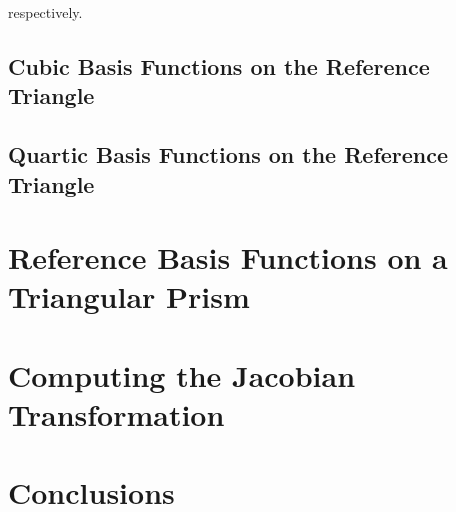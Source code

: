 \documentclass[11pt]{article}
\begin{document}
\noindent respectively.

\subsection{Cubic Basis Functions on the Reference Triangle}
\label{sec::triref_cubic}

\subsection{Quartic Basis Functions on the Reference Triangle}
\label{sec::triref_quartic}

\section{Reference Basis Functions on a Triangular Prism}
\label{sec::triprismref}

\section{Computing the Jacobian Transformation}
\label{sec::jacobian}


\section{Conclusions}
\label{sec::conclusions}



\end{document}
